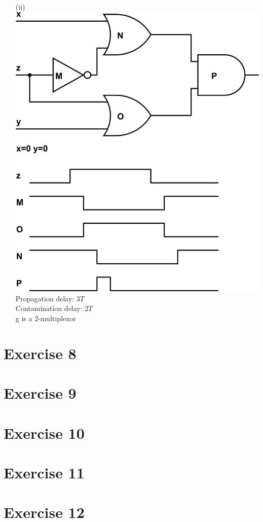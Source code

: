 \documentclass[10pt,twoside,a4paper]{article}
\begin{document}
\begin{enumerate}
\item[(ii)]
\includegraphics[scale=0.8]{sv2-7-ii.png} \\
Propagation delay: $3T$\\
Contamination delay: $2T$\\
g is a 2-multiplexor
\end{enumerate}

\section*{Exercise 8}
\section*{Exercise 9}
\section*{Exercise 10}
\section*{Exercise 11}
\section*{Exercise 12}
\end{document}
